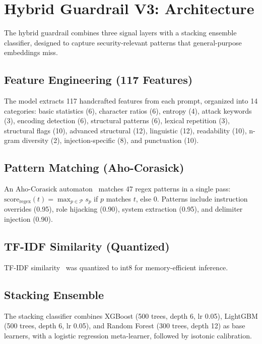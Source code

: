 \documentclass[12pt,a4paper]{article}
\begin{document}
\section{Hybrid Guardrail V3: Architecture}\label{sec:hybrid}

The hybrid guardrail combines three signal layers with a stacking ensemble classifier, designed to capture security-relevant patterns that general-purpose embeddings miss.

\subsection{Feature Engineering (117 Features)}

The model extracts 117 handcrafted features from each prompt, organized into 14 categories: basic statistics (6), character ratios (6), entropy (4), attack keywords (3), encoding detection (6), structural patterns (6), lexical repetition (3), structural flags (10), advanced structural (12), linguistic (12), readability (10), n-gram diversity (2), injection-specific (8), and punctuation (10).

\subsection{Pattern Matching (Aho-Corasick)}

An Aho-Corasick automaton~\citep{aho1975multi} matches 47 regex patterns in a single pass: $\text{score}_{\text{regex}}(t) = \max_{p \in \mathcal{P}} s_p$ if $p$ matches $t$, else 0. Patterns include instruction overrides (0.95), role hijacking (0.90), system extraction (0.95), and delimiter injection (0.90).

\subsection{TF-IDF Similarity (Quantized)}

TF-IDF similarity~\citep{manning1999foundations} was quantized to int8 for memory-efficient inference.

\subsection{Stacking Ensemble}

The stacking classifier combines XGBoost (500 trees, depth 6, lr 0.05), LightGBM (500 trees, depth 6, lr 0.05), and Random Forest (300 trees, depth 12) as base learners, with a logistic regression meta-learner, followed by isotonic calibration.
\end{document}
